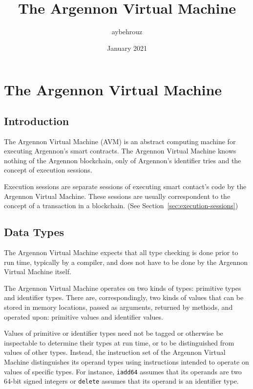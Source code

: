 \documentclass[11pt, a4paper]{report}
\title{The Argennon Virtual Machine}
\author{aybehrouz}
\date{January 2021}
\begin{document}
    \maketitle
    \tableofcontents


    \chapter{The Argennon Virtual Machine}\label{ch:AVM}


    \section{Introduction}\label{sec:introduction}

    The Argennon Virtual Machine (AVM) is an abstract computing machine for executing Argennon's smart contracts. The
    Argennon Virtual Machine knows nothing of the Argennon blockchain, only of Argennon's identifier tries and
    the concept of execution sessions.

    Execution sessions are separate sessions of executing smart contact's code by the Argennon Virtual Machine.
    These sessions are usually correspondent to the concept of a transaction in a blockchain. (See
    Section~\ref{sec:execution-sessions})

    \section{Data Types}\label{sec:data-types}

    The Argennon Virtual Machine expects that all type checking is done prior to run time, typically by a compiler,
    and does not have to be done by the Argennon Virtual Machine itself.

    The Argennon Virtual Machine operates on two kinds of types: primitive types and identifier types. There are,
    correspondingly, two kinds of values that can be stored in memory locations, passed as arguments, returned by
    methods, and operated upon: primitive values and identifier values.

    Values of primitive or identifier types need not be tagged or otherwise be inspectable to determine their types
    at run time, or to be distinguished from values of other types. Instead, the instruction set of the Argennon
    Virtual Machine distinguishes its operand types using instructions intended to operate on values of specific
    types. For instance, \texttt{iadd64} assumes that its operands are two 64-bit signed integers or \texttt{delete}
    assumes that its operand is an identifier type.
\end{document}

